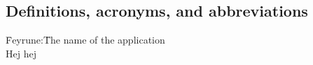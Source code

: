 \subsection{Definitions, acronyms, and abbreviations}
\begin{comment}
Create a word list to avoid confusion and give a definition of every abbreviation
you use in the document.
\end{comment}
\label{wordlist}
\begin{tabbing}
	\indent\= Feyrune:\indent\indent\= The name of the application\\
	\> Hej\> hej
\end{tabbing}